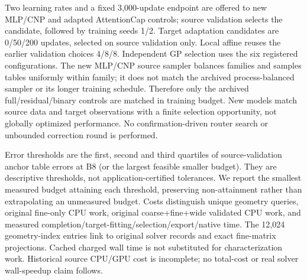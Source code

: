 \documentclass[10pt,twocolumn]{article}
\begin{document}
Two learning rates and a fixed 3,000-update endpoint are offered to new MLP/CNP and adapted AttentionCap controls; source validation selects the candidate, followed by training seeds 1/2. Target adaptation candidates are 0/50/200 updates, selected on source validation only. Local affine reuses the earlier validation choices 4/8/8. Independent GP selection uses the six registered configurations. The new MLP/CNP source sampler balances families and samples tables uniformly within family; it does not match the archived process-balanced sampler or its longer training schedule. Therefore only the archived full/residual/binary controls are matched in training budget. New models match source data and target observations with a finite selection opportunity, not globally optimized performance. No confirmation-driven router search or unbounded correction round is performed.

Error thresholds are the first, second and third quartiles of source-validation anchor table errors at B8 (or the largest feasible smaller budget). They are descriptive thresholds, not application-certified tolerances. We report the smallest measured budget attaining each threshold, preserving non-attainment rather than extrapolating an unmeasured budget. Costs distinguish unique geometry queries, original fine-only CPU work, original coarse+fine+wide validated CPU work, and measured completion/target-fitting/selection/export/native time. The 12,024 geometry-index entries link to original solver records and exact fine-matrix projections. Cached charged wall time is not substituted for characterization work. Historical source CPU/GPU cost is incomplete; no total-cost or real solver wall-speedup claim follows.
\end{document}
